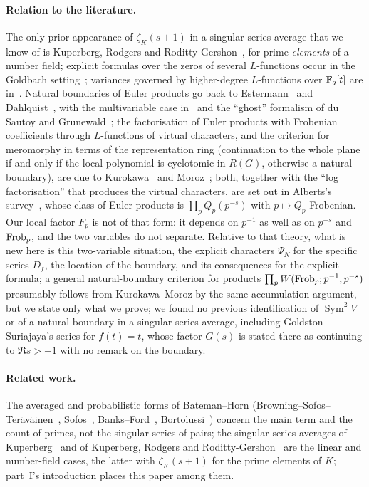 \documentclass[11pt,a4paper]{article}
\theoremstyle{remark}\newtheorem{remark}[theorem]{Remark}
\newcommand{\Sym}{\operatorname{Sym}}\newcommand{\Res}{\operatorname*{Res}}
\begin{document}
\paragraph{Relation to the literature.} The only prior appearance of $\zeta_K(s+1)$ in a singular-series
average that we know of is Kuperberg, Rodgers and Roditty-Gershon~\cite{KuperbergRodgersRodittyGershon2022},
for prime \emph{elements} of a number field; explicit formulas over the zeros of several $L$-functions occur
in the Goldbach setting~\cite{BhowmikHalupczokMatsumotoSuzuki2019,GoldstonSuriajaya2023}; variances
governed by higher-degree $L$-functions over $\mathbb{F}_q[t]$ are in~\cite{HallKeatingRodittyGershon2019}. Natural
boundaries of Euler products go back to Estermann~\cite{Estermann1928} and Dahlquist~\cite{Dahlquist1952},
with the multivariable case in~\cite{BhowmikEssouabriLichtin2007} and the ``ghost'' formalism of du Sautoy
and Grunewald~\cite{duSautoyGrunewald2002}; the factorisation of Euler products with Frobenian coefficients through $L$-functions of virtual
characters, and the criterion for meromorphy in terms of the representation ring (continuation to the whole
plane if and only if the local polynomial is cyclotomic in $R(G)$, otherwise a natural boundary), are due to
Kurokawa~\cite{Kurokawa1986} and Moroz~\cite{Moroz1988}; both, together with the ``log factorisation'' that
produces the virtual characters, are set out in Alberts's survey~\cite{Alberts2024}, whose class of Euler
products is $\prod_pQ_p(p^{-s})$ with $p\mapsto Q_p$ Frobenian. Our local factor $F_p$ is not of that form: it
depends on $p^{-1}$ as well as on $p^{-s}$ and $\operatorname{Frob}_p$, and the two variables do not separate. Relative to
that theory, what is new here is this two-variable situation, the explicit characters $\Psi_N$ for the
specific series $D_f$, the location of the boundary, and its consequences for the explicit formula; a general
natural-boundary criterion for products $\prod_pW(\operatorname{Frob}_p;p^{-1},p^{-s})$ presumably follows from
Kurokawa--Moroz by the same accumulation argument, but we state only what we prove; we found no previous identification of $\Sym^2V$ or of a natural
boundary in a singular-series average, including Goldston--Suriajaya's series for $f(t)=t$, whose factor
$G(s)$ is stated there as continuing to $\Re s>-1$ with no remark on the boundary.

\paragraph{Related work.} The averaged and probabilistic forms of Bateman--Horn
(Browning--Sofos--Ter\"av\"ainen~\cite{BrowningSofosTeravainen2022}, Sofos~\cite{Sofos2026}, Banks--Ford~\cite{BanksFord2026},
Bortolussi~\cite{Bortolussi2026}) concern the main term and the count of primes, not the singular series of pairs;
the singular-series averages of Kuperberg~\cite{Kuperberg2022,Kuperberg2025} and of Kuperberg, Rodgers and
Roditty-Gershon~\cite{KuperbergRodgersRodittyGershon2022} are the linear and number-field cases, the latter with
$\zeta_K(s+1)$ for the prime elements of $K$; part~I's introduction places this paper among them.
\end{document}
